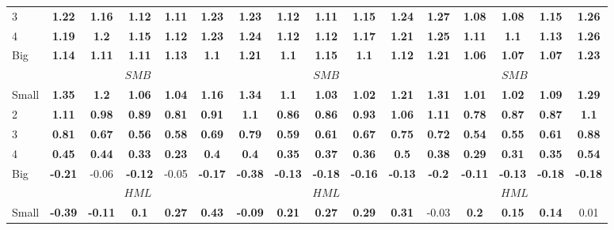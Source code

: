\begin{table}[H]
\begin{tabular}{lccccc|ccccc|ccccc}
3 & \textbf{1.22} & \textbf{1.16} & \textbf{1.12} & \textbf{1.11} & \textbf{1.23} & \textbf{1.23} & \textbf{1.12} & \textbf{1.11} & \textbf{1.15} & \textbf{1.24} & \textbf{1.27} & \textbf{1.08} & \textbf{1.08} & \textbf{1.15} & \textbf{1.26} \\
4 & \textbf{1.19} & \textbf{1.2} & \textbf{1.15} & \textbf{1.12} & \textbf{1.23} & \textbf{1.24} & \textbf{1.12} & \textbf{1.12} & \textbf{1.17} & \textbf{1.21} & \textbf{1.25} & \textbf{1.11} & \textbf{1.1} & \textbf{1.13} & \textbf{1.26} \\
Big & \textbf{1.14} & \textbf{1.11} & \textbf{1.11} & \textbf{1.13} & \textbf{1.1} & \textbf{1.21} & \textbf{1.1} & \textbf{1.15} & \textbf{1.1} & \textbf{1.12} & \textbf{1.21} & \textbf{1.06} & \textbf{1.07} & \textbf{1.07} & \textbf{1.23} \\
 & \multicolumn{5}{c|}{$SMB$} & \multicolumn{5}{c|}{$SMB$} & \multicolumn{5}{c}{$SMB$} \\
Small & \textbf{1.35} & \textbf{1.2} & \textbf{1.06} & \textbf{1.04} & \textbf{1.16} & \textbf{1.34} & \textbf{1.1} & \textbf{1.03} & \textbf{1.02} & \textbf{1.21} & \textbf{1.31} & \textbf{1.01} & \textbf{1.02} & \textbf{1.09} & \textbf{1.29} \\
2 & \textbf{1.11} & \textbf{0.98} & \textbf{0.89} & \textbf{0.81} & \textbf{0.91} & \textbf{1.1} & \textbf{0.86} & \textbf{0.86} & \textbf{0.93} & \textbf{1.06} & \textbf{1.11} & \textbf{0.78} & \textbf{0.87} & \textbf{0.87} & \textbf{1.1} \\
3 & \textbf{0.81} & \textbf{0.67} & \textbf{0.56} & \textbf{0.58} & \textbf{0.69} & \textbf{0.79} & \textbf{0.59} & \textbf{0.61} & \textbf{0.67} & \textbf{0.75} & \textbf{0.72} & \textbf{0.54} & \textbf{0.55} & \textbf{0.61} & \textbf{0.88} \\
4 & \textbf{0.45} & \textbf{0.44} & \textbf{0.33} & \textbf{0.23} & \textbf{0.4} & \textbf{0.4} & \textbf{0.35} & \textbf{0.37} & \textbf{0.36} & \textbf{0.5} & \textbf{0.38} & \textbf{0.29} & \textbf{0.31} & \textbf{0.35} & \textbf{0.54} \\
Big & \textbf{-0.21} & -0.06 & \textbf{-0.12} & -0.05 & \textbf{-0.17} & \textbf{-0.38} & \textbf{-0.13} & \textbf{-0.18} & \textbf{-0.16} & \textbf{-0.13} & \textbf{-0.2} & \textbf{-0.11} & \textbf{-0.13} & \textbf{-0.18} & \textbf{-0.18} \\
 & \multicolumn{5}{c|}{$HML$} & \multicolumn{5}{c|}{$HML$} & \multicolumn{5}{c}{$HML$} \\
Small & \textbf{-0.39} & \textbf{-0.11} & \textbf{0.1} & \textbf{0.27} & \textbf{0.43} & \textbf{-0.09} & \textbf{0.21} & \textbf{0.27} & \textbf{0.29} & \textbf{0.31} & -0.03 & \textbf{0.2} & \textbf{0.15} & \textbf{0.14} & 0.01 \\

\end{tabular}
\end{table}
